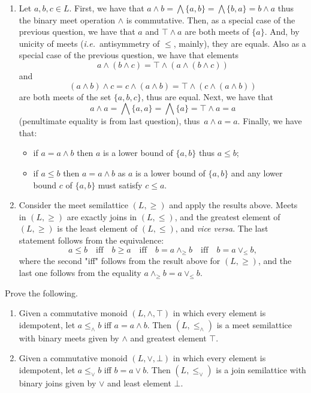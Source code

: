 \documentclass[fontsize=16pt,a4paper,DIV=17,parskip=half]{scrartcl}
\theoremstyle{definition}
\begin{document}
  \begin{enumerate}
    \item Let $a, b, c \in L$. First, we have that $a \wedge b = \bigwedge \{a,b\} = \bigwedge \{b,a\} = b \wedge a$ thus the binary meet operation $\wedge$ is commutative.
      Then, as a special case of the previous question, we have that $a$ and $\top \wedge a$ are both meets of $\{a\}$. And, by unicity of meets (\textit{i.e.}\ antisymmetry of $\le$, mainly), they are equals.
      Also as a special case of the previous question, we have that elements \[
      a \wedge (b \wedge c) = \top \wedge (a \wedge (b \wedge c))
      \] and \[
      (a \wedge b) \wedge c = c \wedge (a \wedge b) = \top \wedge (c \wedge (a \wedge b))
      \]  are both meets of the set $\{a,b,c\}$, thus are equal.
      Next, we have that \[
      a \wedge a = \bigwedge \{a, a\} = \bigwedge \{a\} = \top \wedge a = a
      \](penultimate equality is from last question), thus~$a \wedge a = a$.
      Finally, we have that:
      \begin{itemize}
        \item if $a = a \wedge b$ then $a$ is a lower bound of $\{a,b\}$ thus $a \le b$;
        \item if $a \le b$ then $a = a \wedge b$ as $a$ is a lower bound of $\{a,b\}$ and any lower bound $c$ of $\{a,b\}$ must satisfy $c \le a$.
      \end{itemize}
    \item Consider the meet semilattice $(L, \ge)$ and apply the results above.
      Meets in $(L, \ge)$ are exactly joins in $(L, \le)$, and the greatest element of $(L, \ge)$ is the least element of $(L, \le)$, and \textit{vice versa}.
      The last statement follows from the equivalence:
      \[
      a \le b \quad\text{iff}\quad b\ge a\quad\text{iff}\quad b = a \wedge_\ge b\quad\text{iff}\quad b = a \vee_\le b
      ,\] 
      where the second "iff" follows from the result above for $(L, \ge)$, and the last one follows from the equality $a \wedge_\ge b = a \vee_\le b$.
  \end{enumerate}

  \begin{que}
    Prove the following.
    \begin{enumerate}
      \item Given a commutative monoid $(L, \wedge, \top)$ in which every element is idempotent, let ${a \le_\wedge b}$ iff  $a = a \wedge b$.
        Then $(L, \le_\wedge)$ is a meet semilattice with binary meets given by $\wedge$ and greatest element $\top$.
      \item Given a commutative monoid $(L, \vee, \bot)$ in which every element is idempotent, let ${a \le_\vee b}$ iff  $b = a \vee b$.
        Then $(L, \le_\vee)$ is a join semilattice with binary joins given by $\vee$ and least element $\bot$.
    \end{enumerate}
  \end{que}
\end{document}
